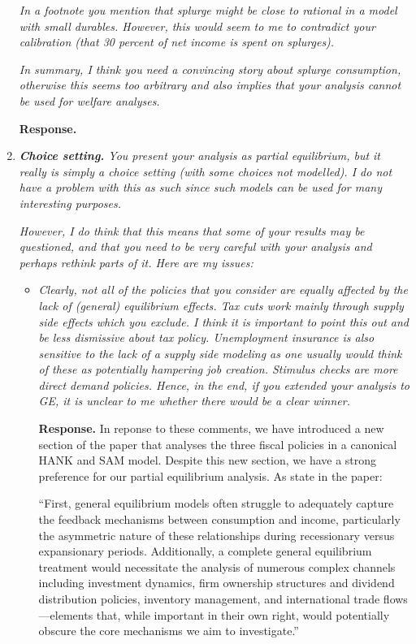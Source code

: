 \documentclass[12pt,letterpaper,english]{article}
\begin{document}
\begin{enumerate}
\textit{In a footnote you mention that splurge might be close to rational in a model with small durables. However, this would seem to me to contradict your calibration (that	30 percent of net income is spent on splurges).}

\textit{In summary, I think you need a convincing story about splurge consumption, otherwise this seems too arbitrary and also implies that your analysis cannot be used for	welfare analyses.}

\noindent \textbf{Response.} 

\item \textit{\textbf{Choice setting.} You present your analysis as partial equilibrium, but it really is simply a choice setting (with some choices not modelled). I do not have a problem	with this as such since such models can be used for many interesting purposes.}

\textit{However, I do think that this means that some of your results may be questioned,	and that you need to be very careful with your analysis and perhaps rethink parts of it. Here are my issues:}

\begin{itemize}
	\item \textit{Clearly, not all of the policies that you consider are equally affected by the lack of (general) equilibrium effects. Tax cuts work mainly through supply		side effects which you exclude. I think it is important to point this out and be less dismissive about tax policy. Unemployment insurance is also sensitive to the lack of a supply side modeling as one usually would think of these as potentially hampering job creation. Stimulus checks are more direct demand policies. Hence, in the end, if you extended your analysis to GE, it is unclear to me whether there would be a clear winner.}
	
\noindent \textbf{Response.} In reponse to these comments, we have introduced a new section of the paper that analyses the three fiscal policies in a canonical HANK and SAM model. Despite this new section, we have a strong preference for our partial equilibrium analysis. As state in the paper:

``First, general equilibrium models often struggle to adequately capture the feedback mechanisms between consumption and income, particularly the asymmetric nature of these relationships during recessionary versus expansionary periods. Additionally, a complete general equilibrium treatment would necessitate the analysis of numerous complex channels including investment dynamics, firm ownership structures and dividend distribution policies, inventory management, and international trade flows—elements that, while important in their own right, would potentially obscure the core mechanisms we aim to investigate.''


\end{itemize}
\end{enumerate}
\end{document}
